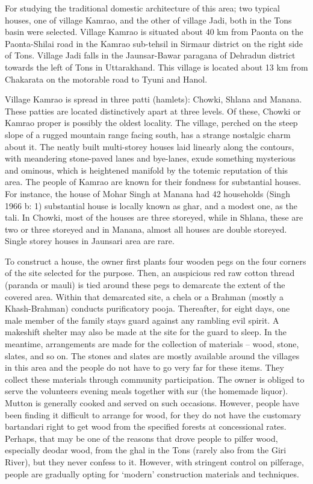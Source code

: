 For studying the traditional domestic architecture of this area; two typical houses, one of village Kamrao, and the other of village Jadi, both in the Tons basin were selected. Village Kamrao is situated about 40 km from Paonta on the Paonta-Shilai road in the Kamrao sub-tehsil in Sirmaur district on the right side of Tons. Village Jadi falls in the Jaunsar-Bawar paragana of Dehradun district towards the left of Tons in Uttarakhand. This village is located about 13 km from Chakarata on the motorable road to Tyuni and Hanol.

Village Kamrao is spread in three patti (hamlets): Chowki, Shlana and Manana. These patties are located distinctively apart at three levels. Of these, Chowki or Kamrao proper is possibly the oldest locality. The village, perched on the steep slope of a rugged mountain range facing south, has a strange nostalgic charm about it. The neatly built multi-storey houses laid linearly along the contours, with meandering stone-paved lanes and bye-lanes, exude something mysterious and ominous, which is heightened manifold by the totemic reputation of this area. The people of Kamrao are known for their fondness for substantial houses. For instance, the house of Mohar Singh at Manana had 42 households (Singh 1966 b: 1) substantial house is locally known as ghar, and a modest one, as the tali. In Chowki, most of the houses are three storeyed, while in Shlana, these are two or three storeyed and in Manana, almost all houses are double storeyed. Single storey houses in Jaunsari area are rare.

To construct a house, the owner first plants four wooden pegs on the four corners of the site selected for the purpose. Then, an auspicious red raw cotton thread (paranda or mauli) is tied around these pegs to demarcate the extent of the covered area. Within that demarcated site, a chela or a Brahman (mostly a Khash-Brahman) conducts purificatory pooja. Thereafter, for eight days, one male member of the family stays guard against any rambling evil spirit. A makeshift shelter may also be made at the site for the guard to sleep. In the meantime, arrangements are made for the collection of materials – wood, stone, slates, and so on. The stones and slates are mostly available around the villages in this area and the people do not have to go very far for these items. They collect these materials through community participation. The owner is obliged to serve the volunteers evening meals together with sur (the homemade liquor). Mutton is generally cooked and served on such occasions. However, people have been finding it difficult to arrange for wood, for they do not have the customary bartandari right to get wood from the specified forests at concessional rates. Perhaps, that may be one of the reasons that drove people to pilfer wood, especially deodar wood, from the ghal in the Tons (rarely also from the Giri River), but they never confess to it. However, with stringent control on pilferage, people are gradually opting for ‘modern’ construction materials and techniques.

